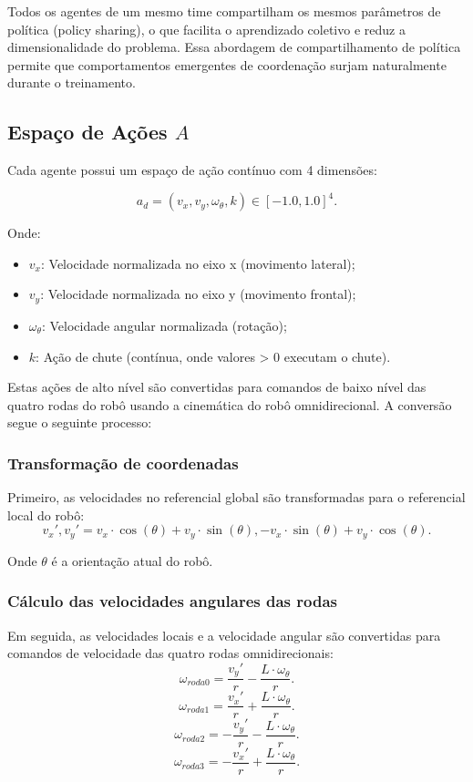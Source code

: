 Todos os agentes de um mesmo time compartilham os mesmos parâmetros de política (policy sharing), o que facilita o aprendizado coletivo e reduz a dimensionalidade do problema. Essa abordagem de compartilhamento de política permite que comportamentos emergentes de coordenação surjam naturalmente durante o treinamento.

\subsection{Espaço de Ações $A$}

Cada agente possui um espaço de ação contínuo com 4 dimensões:

$$a_d = (v_x, v_y, \omega_{\theta}, k) \in [-1.0, 1.0]^4.$$

Onde:
\begin{itemize}
    \item $v_x$: Velocidade normalizada no eixo x (movimento lateral);
    \item $v_y$: Velocidade normalizada no eixo y (movimento frontal);
    \item $\omega_{\theta}$: Velocidade angular normalizada (rotação);
    \item $k$: Ação de chute (contínua, onde valores > 0 executam o chute).
\end{itemize}

Estas ações de alto nível são convertidas para comandos de baixo nível das quatro rodas do robô usando a cinemática do robô omnidirecional. A conversão segue o seguinte processo:

\subsubsection{Transformação de coordenadas}

Primeiro, as velocidades no referencial global são transformadas para o referencial local do robô:
$$v_x', v_y' = v_x \cdot \cos(\theta) + v_y \cdot \sin(\theta), -v_x \cdot \sin(\theta) + v_y \cdot \cos(\theta).$$

Onde $\theta$ é a orientação atual do robô.

\subsubsection{Cálculo das velocidades angulares das rodas}

Em seguida, as velocidades locais e a velocidade angular são convertidas para comandos de velocidade das quatro rodas omnidirecionais:
$$\omega_{roda0} = \frac{v_y'}{r} - \frac{L \cdot \omega_{\theta}}{r}.$$
$$\omega_{roda1} = \frac{v_x'}{r} + \frac{L \cdot \omega_{\theta}}{r}.$$
$$\omega_{roda2} = -\frac{v_y'}{r} - \frac{L \cdot \omega_{\theta}}{r}.$$
$$\omega_{roda3} = -\frac{v_x'}{r} + \frac{L \cdot \omega_{\theta}}{r}.$$

